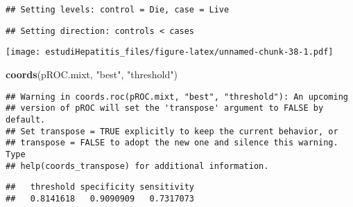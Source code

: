 \documentclass[]{article}
\newenvironment{Shaded}{\begin{snugshade}}{\end{snugshade}}
\newcommand{\DataTypeTok}[1]{\textcolor[rgb]{0.13,0.29,0.53}{#1}}
\newcommand{\KeywordTok}[1]{\textcolor[rgb]{0.13,0.29,0.53}{\textbf{#1}}}
\newcommand{\NormalTok}[1]{#1}
\newcommand{\OperatorTok}[1]{\textcolor[rgb]{0.81,0.36,0.00}{\textbf{#1}}}
\newcommand{\OtherTok}[1]{\textcolor[rgb]{0.56,0.35,0.01}{#1}}
\newcommand{\StringTok}[1]{\textcolor[rgb]{0.31,0.60,0.02}{#1}}
\begin{document}
\begin{Shaded}
\end{Shaded}

\begin{verbatim}
## Setting levels: control = Die, case = Live
\end{verbatim}

\begin{verbatim}
## Setting direction: controls < cases
\end{verbatim}

\texttt{[image: estudiHepatitis\_files/figure-latex/unnamed-chunk-38-1.pdf]}

\begin{Shaded}
\begin{Highlighting}[]
\KeywordTok{coords}\NormalTok{(pROC.mixt, }\StringTok{"best"}\NormalTok{, }\StringTok{"threshold"}\NormalTok{)}
\end{Highlighting}
\end{Shaded}

\begin{verbatim}
## Warning in coords.roc(pROC.mixt, "best", "threshold"): An upcoming
## version of pROC will set the 'transpose' argument to FALSE by default.
## Set transpose = TRUE explicitly to keep the current behavior, or
## transpose = FALSE to adopt the new one and silence this warning. Type
## help(coords_transpose) for additional information.
\end{verbatim}

\begin{verbatim}
##   threshold specificity sensitivity 
##   0.8141618   0.9090909   0.7317073
\end{verbatim}
\end{document}

